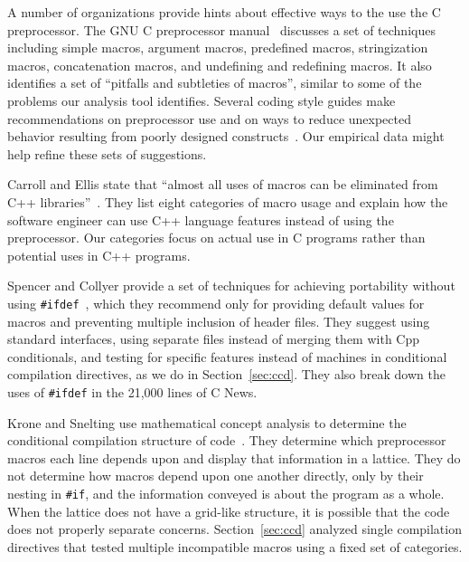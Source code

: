 \documentclass[10pt]{article}
\begin{document}
A number of organizations provide hints about effective ways to the use the
C preprocessor.  The GNU C preprocessor manual~\cite{cpp-manual} discusses
a set of techniques including simple macros, argument macros, predefined
macros, stringization macros, concatenation macros, and undefining and
redefining macros.  It also identifies a set of ``pitfalls and subtleties
of macros'', similar to some of the problems our analysis tool
identifies.  Several coding style guides make recommendations on
preprocessor use and on ways to reduce unexpected behavior resulting from
poorly designed constructs~\cite{Stallman97,ellemtel92,Cannon95,Dolenc90}.
Our empirical data might help refine these sets of suggestions.

Carroll and Ellis state that ``almost all uses of macros can be eliminated
from C++ libraries''~\cite[p.~146]{Carroll95}.  They list eight categories
of macro usage and explain how the software engineer can use C++ language
features instead of using the preprocessor.  Our categories focus on actual
use in C programs rather than potential uses in C++ programs.

Spencer and Collyer provide a set of techniques for achieving portability
without using \texttt{\#ifdef}~\cite{SpencerC92}, which they recommend only
for providing default values for macros and preventing multiple inclusion
of header files.  They suggest using standard interfaces, using separate
files instead of merging them with Cpp conditionals, and testing for
specific features instead of machines in conditional compilation
directives, as we do in Section~\ref{sec:ccd}.  They also break down the
uses of \texttt{\#ifdef} in the 21,000 lines of C News.

Krone and Snelting use mathematical concept analysis to determine the
conditional compilation structure of code~\cite{Krone94}.  They determine
which preprocessor macros each line depends upon and display that
information in a lattice.  They do not determine how macros depend upon one
another directly, only by their nesting in {\tt \#if}, and the information
conveyed is about the program as a whole.  When the lattice does not have a
grid-like structure, it is possible that the code does not properly
separate concerns.  Section~\ref{sec:ccd} analyzed single compilation
directives that tested multiple incompatible macros using a fixed set of
categories.


\end{document}
